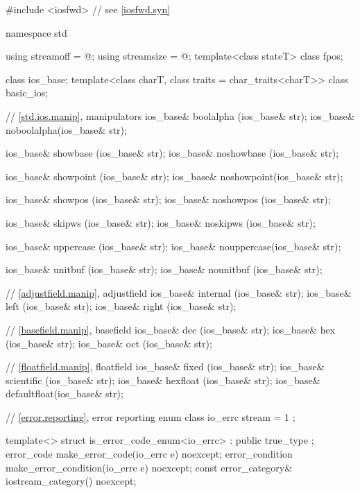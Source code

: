 %
%
\begin{codeblock}
#include <iosfwd>   // see \ref{iosfwd.syn}

namespace std {
  using streamoff  = @\impdef@;
  using streamsize = @\impdef@;
  template<class stateT> class fpos;

  class ios_base;
  template<class charT, class traits = char_traits<charT>>
    class basic_ios;

  // \ref{std.ios.manip}, manipulators
  ios_base& boolalpha  (ios_base& str);
  ios_base& noboolalpha(ios_base& str);

  ios_base& showbase   (ios_base& str);
  ios_base& noshowbase (ios_base& str);

  ios_base& showpoint  (ios_base& str);
  ios_base& noshowpoint(ios_base& str);

  ios_base& showpos    (ios_base& str);
  ios_base& noshowpos  (ios_base& str);

  ios_base& skipws     (ios_base& str);
  ios_base& noskipws   (ios_base& str);

  ios_base& uppercase  (ios_base& str);
  ios_base& nouppercase(ios_base& str);

  ios_base& unitbuf    (ios_base& str);
  ios_base& nounitbuf  (ios_base& str);

  // \ref{adjustfield.manip}, adjustfield
  ios_base& internal   (ios_base& str);
  ios_base& left       (ios_base& str);
  ios_base& right      (ios_base& str);

  // \ref{basefield.manip}, basefield
  ios_base& dec        (ios_base& str);
  ios_base& hex        (ios_base& str);
  ios_base& oct        (ios_base& str);

  // \ref{floatfield.manip}, floatfield
  ios_base& fixed      (ios_base& str);
  ios_base& scientific (ios_base& str);
  ios_base& hexfloat   (ios_base& str);
  ios_base& defaultfloat(ios_base& str);

  // \ref{error.reporting}, error reporting
  enum class io_errc {
    stream = 1
  };

  template<> struct is_error_code_enum<io_errc> : public true_type { };
  error_code make_error_code(io_errc e) noexcept;
  error_condition make_error_condition(io_errc e) noexcept;
  const error_category& iostream_category() noexcept;
}
\end{codeblock}
%
%
%
%
%

